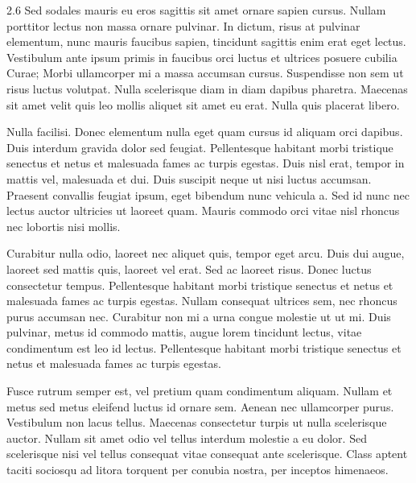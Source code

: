 \documentclass[a0]{a0poster}
\begin{document}

\framethin
\begin{area2}{2.6}
Sed sodales mauris eu eros sagittis sit amet ornare sapien cursus. Nullam porttitor lectus non massa ornare pulvinar. In dictum, risus at pulvinar elementum, nunc mauris faucibus sapien, tincidunt sagittis enim erat eget lectus. Vestibulum ante ipsum primis in faucibus orci luctus et ultrices posuere cubilia Curae; Morbi ullamcorper mi a massa accumsan cursus. Suspendisse non sem ut risus luctus volutpat. Nulla scelerisque diam in diam dapibus pharetra. Maecenas sit amet velit quis leo mollis aliquet sit amet eu erat. Nulla quis placerat libero.

Nulla facilisi. Donec elementum nulla eget quam cursus id aliquam orci dapibus. Duis interdum gravida dolor sed feugiat. Pellentesque habitant morbi tristique senectus et netus et malesuada fames ac turpis egestas. Duis nisl erat, tempor in mattis vel, malesuada et dui. Duis suscipit neque ut nisi luctus accumsan. Praesent convallis feugiat ipsum, eget bibendum nunc vehicula a. Sed id nunc nec lectus auctor ultricies ut laoreet quam. Mauris commodo orci vitae nisl rhoncus nec lobortis nisi mollis.

Curabitur nulla odio, laoreet nec aliquet quis, tempor eget arcu. Duis dui augue, laoreet sed mattis quis, laoreet vel erat. Sed ac laoreet risus. Donec luctus consectetur tempus. Pellentesque habitant morbi tristique senectus et netus et malesuada fames ac turpis egestas. Nullam consequat ultrices sem, nec rhoncus purus accumsan nec. Curabitur non mi a urna congue molestie ut ut mi. Duis pulvinar, metus id commodo mattis, augue lorem tincidunt lectus, vitae condimentum est leo id lectus. Pellentesque habitant morbi tristique senectus et netus et malesuada fames ac turpis egestas.

Fusce rutrum semper est, vel pretium quam condimentum aliquam. Nullam et metus sed metus eleifend luctus id ornare sem. Aenean nec ullamcorper purus. Vestibulum non lacus tellus. Maecenas consectetur turpis ut nulla scelerisque auctor. Nullam sit amet odio vel tellus interdum molestie a eu dolor. Sed scelerisque nisi vel tellus consequat vitae consequat ante scelerisque. Class aptent taciti sociosqu ad litora torquent per conubia nostra, per inceptos himenaeos.
\end{area2}
\end{document}
